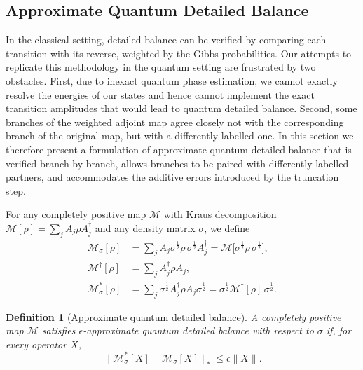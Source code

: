 \documentclass[aps,floatfix,10pt,amssymb,amsfont,amsmath,superscriptaddress,float,nofootinbib,longbibliography,nobalancelastpage,twocolumn]{revtex4-2}
\newtheorem{definition}{Definition}
\begin{document}
\subsection{Approximate Quantum Detailed Balance}
\label{section:detailedbalancedef}
In the classical setting, detailed balance can be verified by comparing each transition with its reverse, weighted by the Gibbs probabilities. Our attempts to replicate this methodology in the quantum setting are frustrated by two obstacles. First, due to inexact quantum phase estimation, we cannot exactly resolve the energies of our states and hence cannot implement the exact transition amplitudes that would lead to quantum detailed balance. Second, some branches of the weighted adjoint map agree closely not with the corresponding branch of the original map, but with a differently labelled one. In this section we therefore present a formulation of approximate quantum detailed balance that is verified branch by branch, allows branches to be paired with differently labelled partners, and accommodates the additive errors introduced by the truncation step.

For any completely positive map $\mathcal{M}$ with Kraus decomposition $\mathcal{M}[\rho] = \sum_{j} A_{j}\rho A^{\dagger}_{j}$ and any density matrix $\sigma$, we define
\begin{align}
    \mathcal{M}_{\sigma}[\rho] &= \sum_{j} A_{j}\sigma^{\frac{1}{2}}\rho\,\sigma^{\frac{1}{2}} A^{\dagger}_{j} = \mathcal{M}\big[\sigma^{\frac{1}{2}}\rho\,\sigma^{\frac{1}{2}}\big],\\
    \mathcal{M}^{\dagger}[\rho] &= \sum_j A^{\dagger}_j \rho A_j,\\
    \mathcal{M}^*_{\sigma}[\rho] &= \sum_{j} \sigma^{\frac{1}{2}}A^{\dagger}_{j}\rho A_{j}\sigma^{\frac{1}{2}} = \sigma^{\frac{1}{2}}\mathcal{M}^{\dagger}[\rho]\,\sigma^{\frac{1}{2}}.
\end{align}

\begin{definition}[Approximate quantum detailed balance]
\label{def:approxdb}
A completely positive map $\mathcal{M}$ satisfies $\epsilon$-approximate quantum
detailed balance with respect to $\sigma$ if, for every operator $X$,
\begin{equation}
    \|\mathcal{M}^*_{\sigma}[X] - \mathcal{M}_{\sigma}[X]\|_* \leq \epsilon\|X\|.
\end{equation}
\end{definition}
\end{document}
